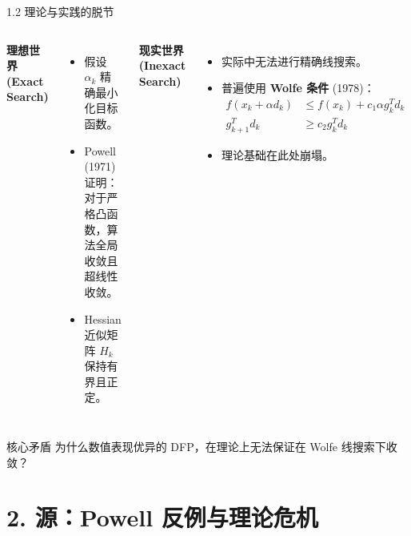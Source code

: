 \documentclass[11pt,hyperref={pdfpagelabels=false}]{beamer}
\begin{document}
\begin{frame}{1.2 理论与实践的脱节}
    \begin{columns}
        \textbf{理想世界 (Exact Search)}
        \begin{itemize}
            \item 假设 $\alpha_k$ 精确最小化目标函数。
            \item Powell (1971) 证明：对于严格凸函数，算法全局收敛且超线性收敛。
            \item Hessian 近似矩阵 $H_k$ 保持有界且正定。
        \end{itemize}

        \textbf{现实世界 (Inexact Search)}
        \begin{itemize}
            \item 实际中无法进行精确线搜索。
            \item 普遍使用 \textbf{Wolfe 条件} (1978)：
            \begin{equation*}
                \begin{aligned}
                    f(x_k + \alpha d_k) &\le f(x_k) + c_1 \alpha g_k^T d_k \\
                    g_{k+1}^T d_k &\ge c_2 g_k^T d_k
                \end{aligned}
            \end{equation*}
            \item 理论基础在此处崩塌。
        \end{itemize}
    \end{columns}
    \vspace{0.5cm}
    \begin{alertblock}{核心矛盾}
        为什么数值表现优异的 DFP，在理论上无法保证在 Wolfe 线搜索下收敛？
    \end{alertblock}
\end{frame}

\section{2. 源：Powell 反例与理论危机}
\end{document}
